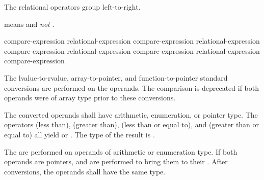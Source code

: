 \pnum
The relational operators group left-to-right.
\begin{example}
 means  and \emph{not}
.
\end{example}
%
%
%
%
%
%
%
%
%
\begin{bnf}
\br
    compare-expression\br
    relational-expression \terminal{<} compare-expression\br
    relational-expression \terminal{>} compare-expression\br
    relational-expression \terminal{<=} compare-expression\br
    relational-expression \terminal{>=} compare-expression
\end{bnf}
%
The
lvalue-to-rvalue,
array-to-pointer,
and function-to-pointer
standard conversions are performed on the operands.
The comparison is deprecated if
both operands were of array type
prior to these conversions.

\pnum
The converted operands shall have arithmetic, enumeration, or pointer type.
The
operators \tcode{<} (less than), \tcode{>} (greater than), \tcode{<=}
(less than or equal to), and \tcode{>=} (greater than or equal to) all
yield  or . The type of the result is
.

\pnum
The  are performed on operands of arithmetic
or enumeration type. If both operands are pointers,  and 
are performed to bring
them to their .
After conversions, the operands shall have the same type.

